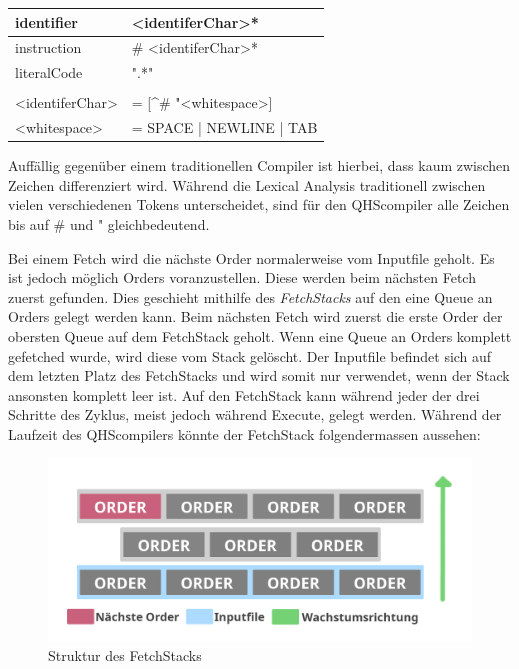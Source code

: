 \begin{table}[h]
    \centering
    \begin{tabular}{ll}
    \multicolumn{1}{l|}{identifier}        & \textless{}identiferChar\textgreater{}*                           \\ \hline
    \multicolumn{1}{l|}{instruction}       & \# \textless{}identiferChar\textgreater{}*                        \\ \hline
    \multicolumn{1}{l|}{literalCode}       & ".*"                                                              \\
                                           &                                                                   \\
    \textless{}identiferChar\textgreater{} & = {[}\textasciicircum{}\# "\textless{}whitespace\textgreater{}{]} \\
    \textless{}whitespace\textgreater{}    & = SPACE | NEWLINE | TAB
    
    \end{tabular}
\end{table}

Auffällig gegenüber einem traditionellen Compiler ist hierbei, dass kaum zwischen Zeichen differenziert wird. Während die Lexical Analysis traditionell zwischen vielen verschiedenen Tokens unterscheidet,
sind für den QHScompiler alle Zeichen bis auf \# und " gleichbedeutend.

Bei einem Fetch wird die nächste Order normalerweise vom Inputfile geholt.
Es ist jedoch möglich Orders voranzustellen. Diese werden beim nächsten Fetch zuerst gefunden. Dies geschieht mithilfe des \textit{FetchStacks} auf den eine Queue an Orders gelegt werden kann.
Beim nächsten Fetch wird zuerst die erste Order der obersten Queue auf dem FetchStack geholt. Wenn eine Queue an Orders komplett gefetched wurde, wird diese vom Stack gelöscht.
Der Inputfile befindet sich auf dem letzten Platz des FetchStacks und wird somit nur verwendet, wenn der Stack ansonsten komplett leer ist.
Auf den FetchStack kann während jeder der drei Schritte des Zyklus, meist jedoch während Execute, gelegt werden.
Während der Laufzeit des QHScompilers könnte der FetchStack folgendermassen aussehen:

\begin{figure}[h!]
    \centering
    \includegraphics[scale=1.1]{resources/images/fetch-stack.png}
    \caption{Struktur des FetchStacks}
    \label{fig:fetchstack}
\end{figure}

